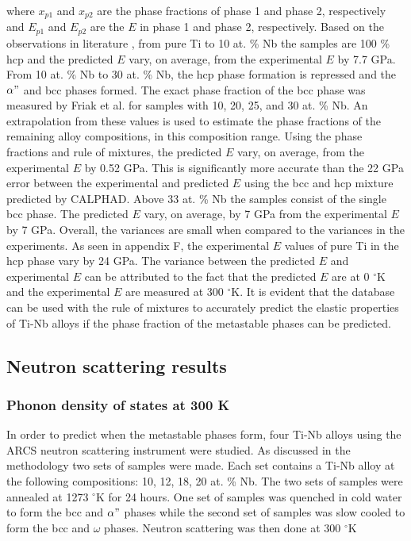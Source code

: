 \noindent where $x_{p1}$ and $x_{p2}$ are the phase fractions of phase 1 and phase 2, respectively and $E_{p1}$ and $E_{p2}$ are the $E$ in phase 1 and phase 2, respectively. Based on the observations in literature \cite{Friak2012,Timoshevskii2011,Friak2012,Karre2015}, from pure Ti to 10 at. \% Nb the samples are 100 \% hcp and the predicted $E$ vary, on average, from the experimental $E$ by 7.7 GPa. From 10 at. \% Nb to 30 at. \% Nb, the hcp phase formation is repressed and the $\alpha"$ and bcc phases formed. The exact phase fraction of the bcc phase was measured by Friak et al. \cite{Friak2012} for samples with 10, 20, 25, and 30 at. \% Nb. An extrapolation from these values is used to estimate the phase fractions of the remaining alloy compositions, in this composition range. Using the phase fractions and rule of mixtures, the predicted $E$ vary, on average, from the experimental $E$ by 0.52 GPa. This is significantly more accurate than the 22 GPa error between the experimental and predicted $E$ using the bcc and hcp mixture predicted by CALPHAD. Above 33 at. \% Nb the samples consist of the single bcc phase. The predicted $E$ vary, on average, by 7 GPa from the experimental $E$ by 7 GPa. Overall, the variances are small when compared to the variances in the experiments. As seen in appendix F, the experimental $E$ values of pure Ti in the hcp phase vary by 24 GPa. The variance between the predicted $E$ and experimental $E$ can be attributed to the fact that the predicted $E$ are at 0 $^\circ$K and the experimental $E$ are measured at 300 $^\circ$K. It is evident that the database can be used with the rule of mixtures to accurately predict the elastic properties of Ti-Nb alloys if the phase fraction of the metastable phases can be predicted.

\subsection{Neutron scattering results}

\subsubsection{Phonon density of states at 300 K}

In order to predict when the metastable phases form, four Ti-Nb alloys using the ARCS neutron scattering instrument were studied. As discussed in the methodology two sets of samples were made. Each set contains a Ti-Nb alloy at the following compositions: 10, 12, 18, 20 at. \% Nb. The two sets of samples were annealed at 1273 $^\circ$K for 24 hours. One set of samples was quenched in cold water to form the bcc and $\alpha"$ phases while the second set of samples was slow cooled to form the bcc and $\omega$ phases. Neutron scattering was then done at 300 $^\circ$K


